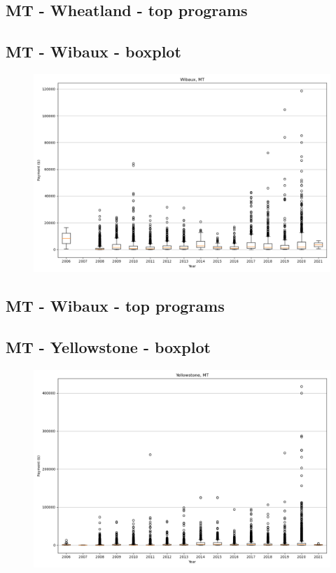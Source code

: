 \subsection*{MT - Wheatland - top programs}

\newpage
\subsection*{MT - Wibaux - boxplot}
\begin{figure}[h]
\centering
\includegraphics[width=7in]{../output/boxplots/counties/Wibaux-MT_boxplot.png}
\end{figure}


\subsection*{MT - Wibaux - top programs}

\newpage
\subsection*{MT - Yellowstone - boxplot}
\begin{figure}[h]
\centering
\includegraphics[width=7in]{../output/boxplots/counties/Yellowstone-MT_boxplot.png}
\end{figure}


